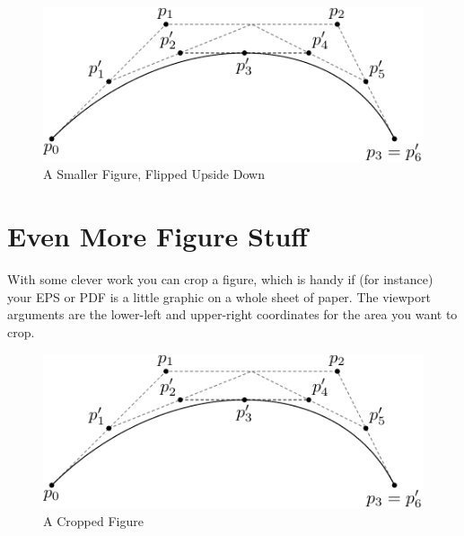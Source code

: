 \documentclass[12pt,twoside]{reedthesis}
\begin{document}
\begin{enumerate}
\begin{enumerate}
\begin{figure}[h!]
	       \centering
	    \includegraphics[scale=0.5,angle=180]{subdivision}
	     \caption{A Smaller Figure, Flipped Upside Down}
	 \label{subd2}
	\end{figure}

\section{Even More Figure Stuff}
With some clever work you can crop a figure, which is handy if (for instance) your EPS or PDF is a little graphic on a whole sheet of paper. The viewport arguments are the lower-left and upper-right coordinates for the area you want to crop.

 	\begin{figure}[h!]
	    	       \centering
	   \includegraphics[clip=true, viewport=.0in .0in 1in 1in]{subdivision}
	    \caption{A Cropped Figure}
	 \label{subd3}
	\end{figure}
	

\end{enumerate}
\end{enumerate}
\end{document}
